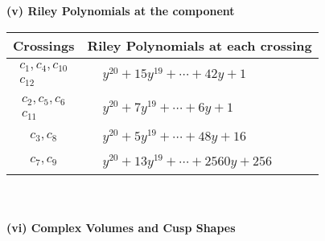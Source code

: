 \documentclass[1p]{elsarticle_modified}
\theoremstyle{definition}
\begin{document}
\newpage\renewcommand{\arraystretch}{1}
\flushleft \textbf{(v) Riley Polynomials at the component}\newline \\
\begin{tabular}{m{50pt}|m{274pt}}
Crossings & \hspace{64pt}Riley Polynomials at each crossing \\
\hline $$\begin{aligned}c_{1},c_{4},c_{10}\\c_{12}\end{aligned}$$&$\begin{aligned}
&y^{20}+15 y^{19}+\cdots+42 y+1
\end{aligned}$\\
\hline $$\begin{aligned}c_{2},c_{5},c_{6}\\c_{11}\end{aligned}$$&$\begin{aligned}
&y^{20}+7 y^{19}+\cdots+6 y+1
\end{aligned}$\\
\hline $$\begin{aligned}c_{3},c_{8}\end{aligned}$$&$\begin{aligned}
&y^{20}+5 y^{19}+\cdots+48 y+16
\end{aligned}$\\
\hline $$\begin{aligned}c_{7},c_{9}\end{aligned}$$&$\begin{aligned}
&y^{20}+13 y^{19}+\cdots+2560 y+256
\end{aligned}$\\
\hline
\end{tabular}\\~\\
\newpage\flushleft \textbf{(vi) Complex Volumes and Cusp Shapes}
\end{document}
